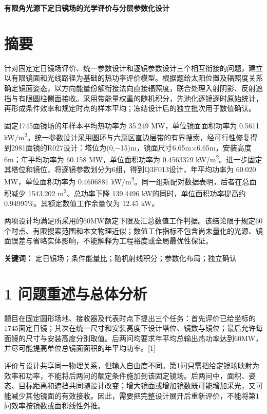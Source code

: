 \documentclass[UTF8,fontset=windows,zihao=-4]{ctexart}
\begin{document}
\begin{center}{\LARGE\bfseries 有限角光源下定日镜场的光学评价与分层参数化设计}\end{center}

\section*{摘要}

针对固定定日镜场评价、统一参数设计和逐镜参数设计三个相互衔接的问题，建立以有限镜面和光线路径为基础的热功率评价模型。根据题给太阳位置及辐照度关系确定镜面姿态，以方向能量份额衔接法向直接辐照度，联合处理入射阴影、反射遮挡与有限圆柱侧面接收。采用带能量权重的随机积分，先池化逐镜逐时原始统计，再形成条件效率和规定时点的样本平均；冻结设计后的独立批次用于数值确认。

固定1745面镜场的年样本平均热功率为 35.249 MW，单位镜面面积功率为 0.5611 kW/m\textsuperscript{2}。统一参数设计采用圆环与六扇区直边层带的有界搜索，经可行性修复得到2981面镜的R027设计：塔位为(0,\(-\)15)m，镜面尺寸6.65m\(\times\)6.65m，安装高度6m；年平均功率为 60.158 MW，单位面积功率为 0.4563379 kW/m\textsuperscript{2}。进一步固定其塔位和镜位，将逐镜参数划分为6组，得到Q3F013设计，年平均功率为 60.020 MW，单位面积功率为 0.4606881 kW/m\textsuperscript{2}。同一组新配对数据表明，后者在总面积减少 1543.202 m\textsuperscript{2}、总功率下降 139.4496 kW的同时，单位面积功率提高约 0.94995\%。其额定数值工作余量仅为 12.45 kW。

两项设计均满足所采用的60MW额定下限及汇总数值工作判据。该结论限于规定60个时点、有限搜索范围和本文物理近似；数值工作指标不包含尚未量化的光源、镜面误差与省略实体影响，不能解释为工程裕度或全局最优性保证。

\textbf{关键词：} 定日镜场；条件能量比；随机射线积分；参数化布局；独立确认

\section*{1 问题重述与总体分析}

题目在固定圆形场地、接收器及代表时点下提出三个任务：首先评价已给坐标的1745面定日镜；其次在统一尺寸和安装高度下设计塔位、镜数与镜位；最后允许每面镜的尺寸与安装高度分别取值。后两问均要求年平均总输出热功率达到60MW，并尽可能提高单位总镜面面积的年平均功率。[1]

评价与设计共享同一物理关系，但输入自由度不同。第1问只需把给定镜场映射为效率和功率，不能将后两问的额定条件施加到该固定镜场。后两问中，面积、姿态、目标距离和遮挡共同随设计改变；增大镜面或增加镜数既可能增加采光，又可能减少其他镜面的有效接收。因此，需要把完整设计展开后重新评价，不能将第1问效率按镜数或面积线性外推。
\end{document}
